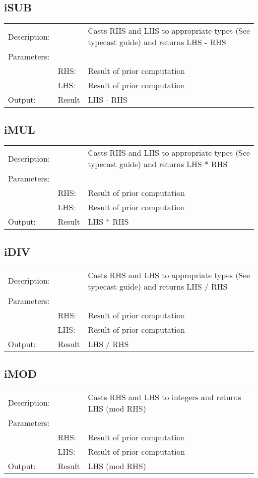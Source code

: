 \documentclass{report}
\begin{document}
\subsection{iSUB}
\begin{tabular}{l l p{10cm}}
Description: & ~    & Casts RHS and LHS to appropriate types (See typecast guide) and returns LHS - RHS\\
Parameters:  & ~ & ~ \\
~			 & RHS: & Result of prior computation\\
~			 & LHS: & Result of prior computation\\
Output:      & Result & LHS - RHS\\
\end{tabular}

\subsection{iMUL}
\begin{tabular}{l l p{10cm}}
Description: & ~    & Casts RHS and LHS to appropriate types (See typecast guide) and returns LHS * RHS\\
Parameters:  & ~ & ~ \\
~			 & RHS: & Result of prior computation\\
~			 & LHS: & Result of prior computation\\
Output:      & Result & LHS * RHS\\
\end{tabular}

\subsection{iDIV}
\begin{tabular}{l l p{10cm}}
Description: & ~    & Casts RHS and LHS to appropriate types (See typecast guide) and returns LHS / RHS\\
Parameters:  & ~ & ~ \\
~			 & RHS: & Result of prior computation\\
~			 & LHS: & Result of prior computation\\
Output:      & Result & LHS / RHS\\
\end{tabular}

\subsection{iMOD}
\begin{tabular}{l l p{10cm}}
Description: & ~    & Casts RHS and LHS to integers and returns LHS (mod RHS)\\
Parameters:  & ~ & ~ \\
~			 & RHS: & Result of prior computation\\
~			 & LHS: & Result of prior computation\\
Output:      & Result & LHS (mod RHS)\\
\end{tabular}
\end{document}
